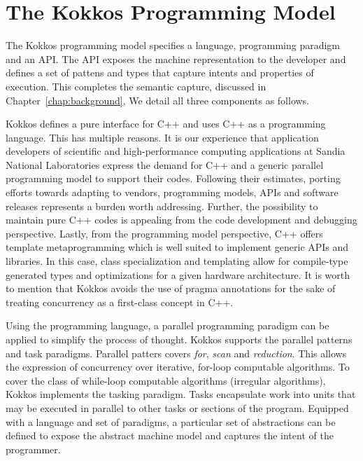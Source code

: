 \section{The Kokkos Programming Model}\label{chap:kokkosPM}

The Kokkos programming model specifies a language, programming paradigm and an API. The API exposes the machine representation to the developer and defines a set of pattens and types that capture intents and properties of execution. This completes the semantic capture, discussed in Chapter~\ref{chap:background}, We detail all three components as follows.

Kokkos defines a pure interface for C++ and uses C++ as a programming language. This has multiple reasons. It is our experience that application developers of scientific and high-performance computing applications at Sandia National Laboratories express the demand for C++ and a generic parallel programming model to support their codes. Following their estimates, porting efforts towards adapting to vendors, programming models, APIs and software releases represents a burden worth addressing. Further, the possibility to maintain pure C++ codes is appealing from the code development and debugging perspective. 
Lastly, from the programming model perspective, C++ offers template metaprogramming which is well suited to implement generic APIs and libraries. In this case, class specialization and templating allow for compile-type generated types and optimizations for a given hardware architecture. It is worth to mention that Kokkos avoids the use of pragma annotations for the sake of treating concurrency as a first-class concept in C++.

Using the programming language, a parallel programming paradigm can be applied to simplify the process of thought. Kokkos supports the parallel patterns and task paradigms. Parallel patters covers \emph{for}, \emph{ scan} and \emph{reduction}. This allows the expression of concurrency over iterative, for-loop computable algorithms. To cover the class of while-loop computable algorithms (irregular algorithms), Kokkos implements the tasking paradigm. Tasks encapsulate work into units that may be executed in parallel to other tasks or sections of the program. Equipped with a language and set of paradigms, a particular set of abstractions can be defined to expose the abstract machine model and captures the intent of the programmer.

